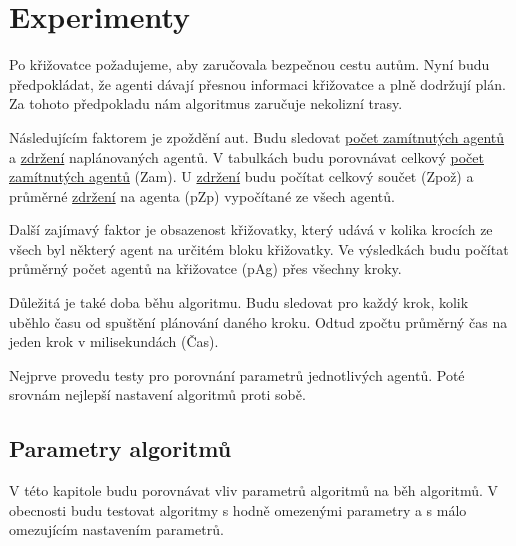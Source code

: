 \chapter{Experimenty}\label{ch:experimenty}


Po křižovatce požadujeme, aby zaručovala bezpečnou cestu autům.
Nyní budu předpokládat, že agenti dávají přesnou informaci křižovatce a plně dodržují plán.
Za tohoto předpokladu nám algoritmus zaručuje nekolizní trasy.

Následujícím faktorem je zpoždění aut.
Budu sledovat \hyperref[par:zamitnuti]{počet zamítnutých agentů} a \hyperref[par:zdrzeni]{zdržení} naplánovaných agentů.
V tabulkách budu porovnávat celkový \hyperref[par:zamitnuti]{počet zamítnutých agentů} (Zam).
U \hyperref[par:zdrzeni]{zdržení} budu počítat celkový součet (Zpož)
a průměrné \hyperref[par:zdrzeni]{zdržení} na agenta (pZp) vypočítané ze všech agentů.

Další zajímavý faktor je obsazenost křižovatky,
který udává v kolika krocích ze všech byl některý agent na určitém bloku křižovatky.
Ve výsledkách budu počítat průměrný počet agentů na křižovatce (pAg) přes všechny kroky.

Důležitá je také doba běhu algoritmu.
Budu sledovat pro každý krok, kolik uběhlo času od spuštění plánování daného kroku.
Odtud zpočtu průměrný čas na jeden krok v milisekundách (Čas).

Nejprve provedu testy pro porovnání parametrů jednotlivých agentů.
Poté srovnám nejlepší nastavení algoritmů proti sobě.





\section{Parametry algoritmů}\label{sec:parametry_algoritmu}

%

V této kapitole budu porovnávat vliv parametrů algoritmů na běh algoritmů.
V obecnosti budu testovat algoritmy s hodně omezenými parametry a s málo omezujícím nastavením parametrů.

